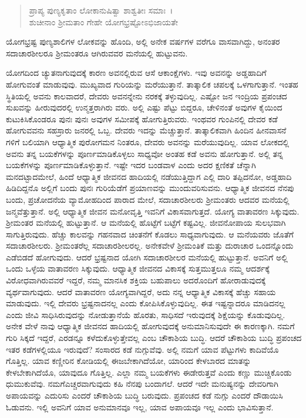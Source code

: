 \begin{verse}
ಪ್ರಾಪ್ಯ ಪುಣ್ಯಕೃತಾಂ ಲೋಕಾನುಷಿತ್ವಾ ಶಾಶ್ವತೀಃ ಸಮಾಃ~।\\ಶುಚೀನಾಂ ಶ‍್ರೀಮತಾಂ ಗೇಹೇ ಯೋಗಭ್ರಷ್ಟೋಽಭಿಜಾಯತೇ 
\end{verse}

{\small ಯೋಗಭ್ರಷ್ಟ ಪುಣ್ಯಶಾಲಿಗಳ ಲೋಕವನ್ನು ಹೊಂದಿ, ಅಲ್ಲಿ ಅನೇಕ ವರ್ಷಗಳ ವರೆಗೂ ವಾಸವಾಗಿದ್ದು, ಅನಂತರ ಸದಾಚಾರಶೀಲರೂ ಶ‍್ರೀಮಂತರೂ ಆಗಿರುವವರ ಮನೆಯಲ್ಲಿ ಹುಟ್ಟುವನು.}

ಯೋಗದಿಂದ ಚ್ಯುತನಾಗುವುದಕ್ಕೆ ಕಾರಣ ಅವನಲ್ಲಿರುವ ಆಸೆ ಆಕಾಂಕ್ಷೆಗಳು. ಇವು ಅವನನ್ನು ಅಡ್ಡಹಾದಿಗೆ ಹೋಗುವಂತೆ ಮಾಡುವುವು. ಮುಖ್ಯವಾದ ಗುರಿಯನ್ನು ಮರೆಯುತ್ತಾನೆ. ತಾತ್ಕಾಲಿಕ ಚಪಲಕ್ಕೆ ಒಳಗಾಗುತ್ತಾನೆ. ಇಂತಹ ಸ್ಥಿತಿಯಲ್ಲಿ ಅವನು ಕಾಲವಾದರೆ, ದೇವರು ಅವನನ್ನೇನು ನರಕಕ್ಕೆ ತಳ್ಳುವುದಿಲ್ಲ. ಎಷ್ಟೋ ಜನ ಇಂದ್ರಿಯ ಪ್ರಪಂಚದ ಸುಖವನ್ನು ಹೀರುವುದರಲ್ಲಿ ಉನ್ಮತ್ತರಾಗಿರು ವರು. ಅಲ್ಲಿ ಎಷ್ಟು ಪೆಟ್ಟು ಬಿದ್ದರೂ, ಚೇಳಿನಂತೆ ಅವುಗಳ ಕೈಯಿಂದ ಕುಟುಕಿಸಿಕೊಂಡರೂ ಪುನಃ ಪುನಃ ಅವುಗಳ ಸಮೀಪಕ್ಕೆ ಹೋಗುತ್ತಿರುವರು. ಇಂಥವರ ಗುಂಪಿನಲ್ಲಿ ದೇವರ ಕಡೆ ಹೋಗುವವನು ಸಹಸ್ರಾರು ಜನರಲ್ಲಿ ಒಬ್ಬ. ದೇವರು ಇದನ್ನು ಮೆಚ್ಚುತ್ತಾನೆ. ತಾತ್ಕಾಲಿಕವಾಗಿ ಹಿಂದಿನ ಹೀನವಾಸನೆ ಗಳಿಗೆ ಬಲಿಯಾಗಿ ಆಧ್ಯಾತ್ಮಿಕ ಪುರೋಗಮನ ನಿಂತರೂ, ದೇವರು ಅವನನ್ನು ಮರೆಯುವುದಿಲ್ಲ. ಯಾವ ಲೋಕದಲ್ಲಿ ಅವನು ತನ್ನ ಬಯಕೆಗಳನ್ನು ಪೂರ್ಣಮಾಡಿಕೊಳ್ಳಲು ಸಾಧ್ಯವೋ ಅಂತಹ ಕಡೆ ಅವನು ಹೋಗುತ್ತಾನೆ. ಅಲ್ಲಿ ತನ್ನ ಬಯಕೆಗಳನ್ನು ಪೂರ್ಣಮಾಡಿಕೊಳ್ಳುತ್ತಾನೆ. ಇಷ್ಟೇ ಇದರ ಬಂಡವಾಳ ಎಂದು ಅದರ ಕ್ಷಣಿಕತೆ ಚೆನ್ನಾಗಿ ಮನದಟ್ಟಾದಮೇಲೆ, ಹಿಂದೆ ಆಧ್ಯಾತ್ಮಿಕ ಜೀವನದ ಹಾದಿಯಲ್ಲಿ ನಡೆಯುತ್ತಿದ್ದಾಗ ಎಲ್ಲಿ ದಾರಿ ತಪ್ಪಿದನೋ, ಅಡ್ಡಹಾದಿ ಹಿಡಿದಿದ್ದನೊ ಅಲ್ಲಿಗೆ ಬಂದು ಪುನಃ ಗುರಿಯೆಡೆಗೆ ಪ್ರಯಾಣವನ್ನು ಮುಂದುವರಿಸುವನು. ಆಧ್ಯಾತ್ಮಿಕ ಜೀವನದ ನೆನಪು ಬಂದು, ಪ್ರಚೋದನೆಯ ವ್ಯಾಮೋಹದಿಂದ ಪಾರಾದ ಮೇಲೆ, ಸದಾಚಾರಶೀಲರು ಶ‍್ರೀಮಂತರು ಆದವರ ಮನೆಯಲ್ಲಿ ಜನ್ಮವೆತ್ತುತ್ತಾನೆ. ಅಲ್ಲಿ ಆಧ್ಯಾತ್ಮಿಕ ಜೀವನ ಮನೋವೃತ್ತಿ ಇವನಿಗೆ ವಿಕಾಸವಾಗುತ್ತದೆ. ಯೋಗ್ಯ ವಾತಾವರಣ ಸಿಕ್ಕುವುದು. ಶ‍್ರೀಮಂತರ ಮನೆಯಲ್ಲಿ ಹುಟ್ಟುತ್ತಾನೆ. ಆ ಮನೆಯಲ್ಲಿ ಹೊಟ್ಟೆಗೆ ಬಟ್ಟೆಗೆ ಕಷ್ಟವಿಲ್ಲ. ಜೀವನೋಪಾಯ ಸುಲಭವಾಗಿ ಸಾಗುತ್ತಿರುವುದು. ಹೆಚ್ಚು ಕಾಲವನ್ನು ಗಹನವಾದ ಚಿಂತನೆಗೆ ಕೊಡಲು ಸಾಧ್ಯವಾಗುವುದು. ಆ ಮನೆಯವರು ಜೊತೆಗೆ ಸದಾಚಾರಶೀಲರು. ಶ‍್ರೀಮಂತರೆಲ್ಲ ಸದಾಚಾರಶೀಲರಲ್ಲ. ಅನೇಕವೇಳೆ ಶ‍್ರೀಮಂತಿಕೆ ಮತ್ತು ದುರಾಚಾರ ಒಂದನ್ನೊಂದು ಎಡೆಬಿಡದೆ ಹೋಗುವುದು. ಆದರೆ ಭ್ರಷ್ಟನಾದ ಯೋಗಿ ಸದಾಚಾರಶೀಲರ ಮನೆಯಲ್ಲಿ ಹುಟ್ಟುತ್ತಾನೆ. ಅವನಿಗೆ ಅಲ್ಲಿ ಒಂದು ಒಳ್ಳೆಯ ವಾತಾವರಣ ಸಿಕ್ಕುವುದು. ಆಧ್ಯಾತ್ಮಿಕ ಜೀವನದ ವಿಕಾಸಕ್ಕೆ ಸುತ್ತಮುತ್ತಲೂ ನಮ್ಮ ಆದರ್ಶಕ್ಕೆ ವಿರೋಧವಾಗಿರುವವರೆ ಇದ್ದರೆ, ನಮ್ಮ ಮಾನಸಿಕ ಶಕ್ತಿಯ ಬಹುಪಾಲು ಅದರೊಂದಿಗೆ ಹೋರಾಡುವುದಕ್ಕೆ ವ್ಯರ್ಥವಾಗುವುದು. ಆದರೆ ವಾತಾವರಣ ಯೋಗ್ಯವಾಗಿದ್ದರೆ, ಅದು ನನ್ನ ಆಧ್ಯಾತ್ಮಿಕ ವಿಕಾಸಕ್ಕೆ ಹೆಚ್ಚು ಸಹಾಯ ಮಾಡುವುದು. ಇಲ್ಲಿ ದೇವರು ಭ್ರಷ್ಟನಾದನಲ್ಲ ಎಂದು ಕೋಪಿಸಿಕೊಳ್ಳುವುದಿಲ್ಲ. ಈತ ಇಷ್ಟನ್ನಾದರೂ ಮಾಡಿದನಲ್ಲ ಎಂದು ಜೀವಿ ಸಾಧಿಸಿರುವುದನ್ನು ನೋಡುತ್ತಾನೆಯೆ ಹೊರತು, ಸಾಧಿಸದೆ ಇರುವುದಕ್ಕೆ ಶಿಕ್ಷೆಯನ್ನು ಕೊಡುವುದಿಲ್ಲ. ಅನೇಕ ವೇಳೆ ನಾವು ಆಧ್ಯಾತ್ಮಿಕ ಜೀವನದ ಹಾದಿಯಲ್ಲಿ ಹೋಗುವುದಕ್ಕೆ ಅನುಮಾನಿಸುವುದೇ ಈ ಕಾರಣಕ್ಕಾಗಿ. ನಮಗೆ ಗುರಿ ಸಿಕ್ಕದೆ ಇದ್ದರೆ, ಎರಡನ್ನೂ ಕಳೆದುಕೊಳ್ಳುತ್ತೇವಲ್ಲ ಎಂಬ ಚೌಕಾಶಿಯ ಬುದ್ಧಿ. ಆದರೆ ಚೌಕಾಶಿಯ ಬುದ್ಧಿ ಪ್ರಪಂಚದ ಇತರ ಕಡೆಗಳಲ್ಲಿಯೂ ಇರುವುದೆ? ಸಂಸಾರದ ಕಡೆ ನುಗ್ಗುವೆವು. ಅಲ್ಲಿ ನಮಗೆ ಯಾವ ಪೆಟ್ಟುಗಳು ಕಾದಿವೆಯೊ ಗೊತ್ತಿಲ್ಲ. ಯಾವ ಕಣ್ಣೀರಿನ ಕೋಡಿಯಲ್ಲಿ ಈಜಬೇಕಾಗಿದೆಯೋ, ಯಾರಿಂದ ಕೇಳಬಾರದ ಮಾತನ್ನು ಕೇಳಬೇಕಾಗಿದೆಯೊ, ಯಾವುದೂ ಗೊತ್ತಿಲ್ಲ. ಎಲ್ಲಾ ನಮ್ಮ ಬಯಕೆಗಳು ಈಡೇರುತ್ತವೆ ಎಂದು ಕಣ್ಣು ಮುಚ್ಚಿಕೊಂಡು ಧುಮುಕುವೆವು. ನಮಗೆಎಚ್ಚರವಾಗುವುದು ಕಹಿ ನೆನಪು ಬಂದಾಗಲೆ. ಆದರೆ ಇದೇ ಮನುಷ್ಯನನ್ನು ದೇವರಿಗಾಗಿ ಅಪಾಯವನ್ನು ಎದುರಿಸು ಎಂದರೆ ಚೌಕಾಶಿಯ ಬುದ್ಧಿ ಬರುವುದು. ಪ್ರಪಂಚದ ಕಡೆ ನುಗ್ಗು ಎಂದರೆ ದೌಡಾಯಿಸಿ ಓಡುವನು. ಇಲ್ಲಿ ಅವನಿಗೆ ಯಾವ ಅನುಮಾನವೂ ಇಲ್ಲ, ಯಾವ ಅಪಾಯವೂ ಇಲ್ಲ ಎಂದು ಭಾವಿಸುತ್ತಾನೆ.

